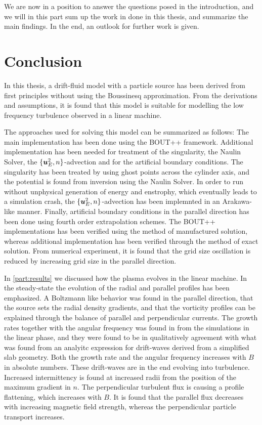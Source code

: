 %
We are now in a position to answer the questions posed in the introduction, and we will in this part sum up the work in done in this thesis, and summarize the main findings.
In the end, an outlook for further work is given.

\section*{Conclusion}
%
In this thesis, a drift-fluid model with a particle source has been derived from first principles without using the Boussinesq approximation.
From the derivations and assumptions, it is found that this model is suitable for modelling the low frequency turbulence observed in a linear machine.

The approaches used for solving this model can be summarized as follows:
The main implementation has been done using the BOUT++ framework.
Additional implementation has been needed for treatment of the singularity, the Naulin Solver, the $\{\boldsymbol{u}_E^2,n\}$-advection and for the artificial boundary conditions.
The singularity has been treated by using ghost points across the cylinder axis, and the potential is found from inversion using the Naulin Solver.
In order to run without unphysical generation of energy and enstrophy, which eventually leads to a simulation crash, the $\{\boldsymbol{u}_E^2,n\}$-advection has been implemnted in an Arakawa-like manner.
Finally, artificial boundary conditions in the parallel direction has been done using fourth order extrapolation schemes.
The BOUT++ implementations has been verified using the method of manufactured solution, whereas additional implementation has been verified through the method of exact solution.
From numerical experiment, it is found that the grid size oscillation is reduced by increasing grid size in the parallel direction.

In \cref{part:results} we discussed how the plasma evolves in the linear machine.
In the steady-state the evolution of the radial and parallel profiles has been emphasized.
A Boltzmann like behavior was found in the parallel direction, that the source sets the radial density gradients, and that the vorticity profiles can be explained through the balance of parallel and perpendicular currents.
The growth rates together with the angular frequency was found in from the simulations in the linear phase, and they were found to be in qualitatively agreement with what was found from an analyitc expression for drift-waves derived from a simplified slab geometry.
Both the growth rate and the angular frequency increases with $B$ in absolute numbers.
These drift-waves are in the end evolving into turbulence.
Increased intermittency is found at increased radii from the position of the maximum gradient in $n$.
The perpendicular turbulent flux is causing a profile flattening, which increases with $B$.
It is found that the parallel flux decreases with increasing magnetic field strength, whereas the perpendicular particle transport increases.

